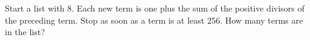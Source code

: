 Start a list with $8$. Each new term is one plus the sum of the positive divisors of the preceding term. Stop as soon as a term is at least $256$. How many terms are in the list?
